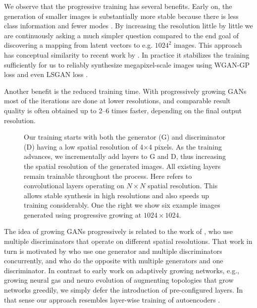 We observe that the progressive training has several benefits. Early on, the generation of smaller images is substantially more stable because there is less class information and fewer modes \citep{Odena2017}. By increasing the resolution little by little we are continuously asking a much simpler question compared to the end goal of discovering a mapping from latent vectors to e.g. $1024^2$ images. This approach has conceptual similarity to recent work by \cite{Chen2017}. In practice it stabilizes the training sufficiently for us to reliably synthesize megapixel-scale images using WGAN-GP loss \citep{Gulrajani2017} and even LSGAN loss \citep{Mao2016}.

Another benefit is the reduced training time. With progressively growing GANs most of the iterations are done at lower resolutions, and comparable result quality is often obtained up to 2--6 times faster, depending on the final output resolution.

\begin{figure}[t]
\centering
\hfill

\caption{Our training starts with both the generator (\textsc{G}) and discriminator (\textsc{D}) having a low spatial resolution of 4$\times$4 pixels. As the training advances, we incrementally add layers to \textsc{G} and \textsc{D}, thus increasing the spatial resolution of the generated images. All existing layers remain trainable throughout the process. Here  refers to convolutional layers operating on $N\times N$ spatial resolution. This allows stable synthesis in high resolutions and also speeds up training considerably. One the right we show six example images generated using progressive growing at $1024\times1024$.
}
\label{fig:incremental}
\end{figure}

The idea of growing GANs progressively is related to the work of \cite{Wang2017}, who use multiple discriminators that operate on different spatial resolutions. That work in turn is motivated by \cite{Durugkar2016} who use one generator and multiple discriminators concurrently, and \cite{Ghosh2017} who do the opposite with multiple generators and one discriminator.
 In contrast to early work on adaptively growing networks, e.g., growing neural gas \citep{Fritzke1994} and neuro evolution of augmenting topologies \citep{Stanley2002} that grow networks greedily, we simply defer the introduction of pre-configured layers. In that sense our approach resembles layer-wise training of autoencoders \citep{Bengio2006}.

